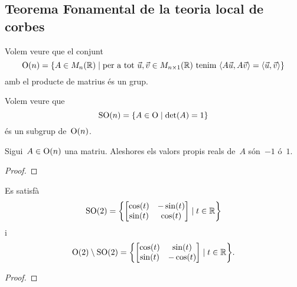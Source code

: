 \documentclass[../../Main.tex]{subfiles}
\begin{document}
	\subsection{Teorema Fonamental de la teoria local de corbes}
	\begin{example}
		\label{ex:grup ortogonal}
		Volem veure que el conjunt
		\[
		    \GrupOrtogonal(n)=\{A\in\matrius_{n}(\mathbb{R})\mid\text{per a tot }\vec{u},\vec{v}\in\matrius_{n\times1}(\mathbb{R})\text{ tenim }\prodesc{A\vec{u}}{A\vec{v}}=\prodesc{\vec{u}}{\vec{v}}\}
		\]
		amb el producte de matrius és un grup.
		\begin{solution}
		\end{solution}
	\end{example}
	\begin{example}
		\label{ex:grup especial ortogonal}
		Volem veure que
		\[
		    \operatorname{SO}(n)=\{A\in\operatorname{O}\mid\det(A)=1\}
		\]
		és un subgrup de~\(\operatorname{O}(n)\).
		\begin{solution}
		\end{solution}
	\end{example}
	\begin{proposition}
		\label{prop:els valors propis d'una matriu ortogonal són -1 o 1}
		Sigui~\(A\in\operatorname{O}(n)\) una matriu.
		Aleshores els valors propis reals de~\(A\) són~\(-1\) ó~\(1\).
		\begin{proof}
		\end{proof}
	\end{proposition}
	\begin{proposition}
		\label{prop:caracterització de les matrius ortogonals 2x2}
		Es satisfà
		\[\GrupEspecialOrtogonal(2)=\left\{\begin{bmatrix}
			\cos(t) & -\sin(t) \\
			\sin(t) & \cos(t)
		\end{bmatrix}\mid t\in\mathbb{R}\right\}\]
		i
		\[\GrupOrtogonal(2)\setminus\GrupEspecialOrtogonal(2)=\left\{\begin{bmatrix}
			\cos(t) & \sin(t) \\
			\sin(t) & -\cos(t)
		\end{bmatrix}\mid t\in\mathbb{R}\right\}.\]
		\begin{proof}
		\end{proof}
	\end{proposition}
\end{document}
